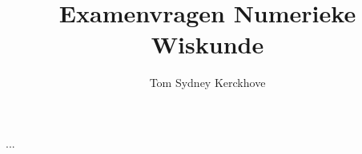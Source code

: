 \documentclass[12pt,a4paper]{report}
\author{Tom Sydney Kerckhove}
\title{Examenvragen Numerieke Wiskunde}
\begin{document}
\maketitle
\pagebreak

...
\end{document}
